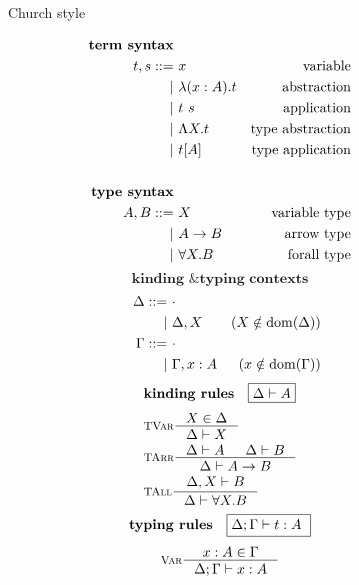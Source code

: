 \begin{figure}
\begin{singlespace}
\begin{minipage}{.46\textwidth}
        \begin{center}Church style\end{center}
\def\baselinestretch{0}
\small
\begin{align*}
\textbf{term syntax} \\
t,s ::= &~ x           & \text{variable}    \\
      | &~ \lambda(x:A) . t & \text{abstraction} \\
      | &~ t ~ s       & \text{application} \\
      | &~ \Lambda X    . t & \text{type abstraction} \\
      | &~ t [A]       & \text{type application} \\
\\
\textbf{type syntax} \\
A,B ::= &~ X           & \text{variable type}   \\
      | &~ A -> B      & \text{arrow type} \\
      | &~ \forall X.B & \text{forall type}   \\
\end{align*}
\[ \textbf{kinding \& typing contexts} \]\vspace*{-1em}
\begin{align*}\quad
\Delta ::= &~ \cdot \\
         | &~ \Delta, X & (X\notin \mathop{\mathrm{dom}}(\Delta)) \\
\Gamma ::= &~ \cdot \\
         | &~ \Gamma, x:A & (x\notin \mathop{\mathrm{dom}}(\Gamma)) \\
\end{align*}
\[ \textbf{kinding rules} \quad \framebox{$ \Delta |- A $} \]\vspace*{-1em}
\begin{align*}
& \inference[\sc TVar]{X \in \Delta}{\Delta |- X} \\
& \inference[\sc TArr]{\Delta |- A & \Delta |- B}{\Delta |- A -> B} \\
& \inference[\sc TAll]{\Delta,X |- B}{\Delta |- \forall X.B} \\
\end{align*}
\[ \textbf{typing rules} \quad \framebox{$ \Delta;\Gamma |- t : A $ } \]
\vspace*{-1em}
\begin{align*}
& \inference[\sc Var]{x:A \in \Gamma}{\Delta;\Gamma |- x:A} \\

\end{align*}
\end{minipage}
\end{singlespace}
\end{figure}
